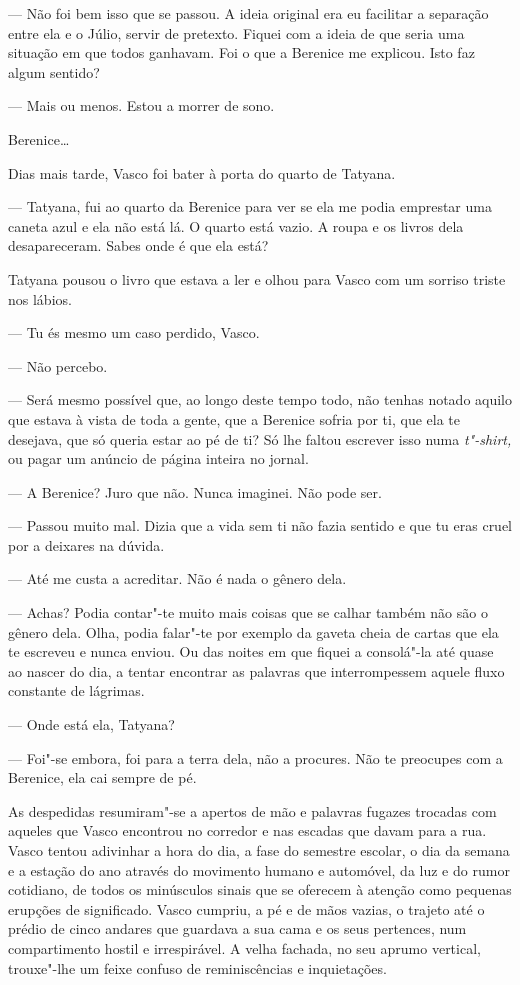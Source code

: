 --- Não foi bem isso que se passou. A ideia original era eu facilitar a
  separação entre ela e o Júlio, servir de pretexto. Fiquei com a ideia
  de que seria uma situação em que todos ganhavam. Foi o que a Berenice
  me explicou. Isto faz algum sentido?

--- Mais ou menos. Estou a morrer de sono.

Berenice\ldots{}


Dias mais tarde, Vasco foi bater à porta do quarto de Tatyana.

--- Tatyana, fui ao quarto da Berenice para ver se ela me podia emprestar
  uma caneta azul e ela não está lá. O quarto está vazio. A roupa e os
  livros dela desapareceram. Sabes onde é que ela está?


Tatyana pousou o livro que estava a ler e olhou para Vasco com um
sorriso triste nos lábios.

--- Tu és mesmo um caso perdido, Vasco.

--- Não percebo.

--- Será mesmo possível que, ao longo deste tempo todo, não tenhas notado
  aquilo que estava à vista de toda a gente, que a Berenice sofria por
  ti, que ela te desejava, que só queria estar ao pé de ti? Só lhe
  faltou escrever isso numa \emph{t"-shirt, }ou pagar um anúncio de
  página inteira no jornal.

--- A Berenice? Juro que não. Nunca imaginei. Não pode ser.

--- Passou muito mal. Dizia que a vida sem ti não fazia
sentido e que tu eras cruel por a deixares na dúvida.

--- Até me custa a acreditar. Não é nada o gênero dela.

--- Achas? Podia contar"-te muito mais coisas que se calhar
também não são o gênero dela. Olha, podia falar"-te por exemplo
da gaveta cheia de cartas que ela te escreveu e nunca enviou. Ou das
noites em que fiquei a consolá"-la até quase ao nascer do dia, a tentar
encontrar as palavras que interrompessem aquele fluxo constante de
lágrimas.

--- Onde está ela, Tatyana?

--- Foi"-se embora, foi para a terra dela, não a procures.
Não te preocupes com a Berenice, ela cai sempre de pé.

As despedidas resumiram"-se a apertos de mão e palavras fugazes trocadas
com aqueles que Vasco encontrou no corredor e nas escadas que davam para
a rua. Vasco tentou adivinhar a hora do dia, a fase do semestre escolar,
o dia da semana e a estação do ano através do movimento humano e
automóvel, da luz e do rumor cotidiano, de todos os minúsculos sinais
que se oferecem à atenção como pequenas erupções de significado. Vasco
cumpriu, a pé e de mãos vazias, o trajeto até o prédio de cinco
andares que guardava a sua cama e os seus pertences, num compartimento
hostil e irrespirável. A velha fachada, no seu aprumo vertical,
trouxe"-lhe um feixe confuso de reminiscências e inquietações.


